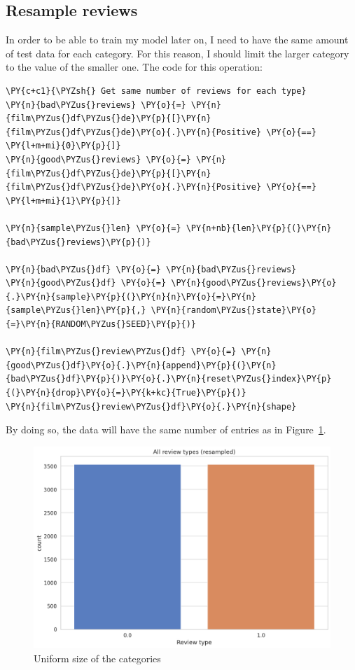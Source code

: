 \subsection{Resample reviews}
\label{chap:resample}
In order to be able to train my model later on, I need to have the same amount of test data for each category. For this reason, I should limit the larger category to the value of the smaller one.
The code for this operation:
        \begin{tcolorbox}[breakable, size=fbox, boxrule=1pt, pad at break*=1mm,colback=cellbackground, colframe=cellborder]
\begin{Verbatim}[commandchars=\\\{\},fontsize=\footnotesize]
\PY{c+c1}{\PYZsh{} Get same number of reviews for each type}
\PY{n}{bad\PYZus{}reviews} \PY{o}{=} \PY{n}{film\PYZus{}df\PYZus{}de}\PY{p}{[}\PY{n}{film\PYZus{}df\PYZus{}de}\PY{o}{.}\PY{n}{Positive} \PY{o}{==} \PY{l+m+mi}{0}\PY{p}{]}
\PY{n}{good\PYZus{}reviews} \PY{o}{=} \PY{n}{film\PYZus{}df\PYZus{}de}\PY{p}{[}\PY{n}{film\PYZus{}df\PYZus{}de}\PY{o}{.}\PY{n}{Positive} \PY{o}{==} \PY{l+m+mi}{1}\PY{p}{]}

\PY{n}{sample\PYZus{}len} \PY{o}{=} \PY{n+nb}{len}\PY{p}{(}\PY{n}{bad\PYZus{}reviews}\PY{p}{)}

\PY{n}{bad\PYZus{}df} \PY{o}{=} \PY{n}{bad\PYZus{}reviews}
\PY{n}{good\PYZus{}df} \PY{o}{=} \PY{n}{good\PYZus{}reviews}\PY{o}{.}\PY{n}{sample}\PY{p}{(}\PY{n}{n}\PY{o}{=}\PY{n}{sample\PYZus{}len}\PY{p}{,} \PY{n}{random\PYZus{}state}\PY{o}{=}\PY{n}{RANDOM\PYZus{}SEED}\PY{p}{)}

\PY{n}{film\PYZus{}review\PYZus{}df} \PY{o}{=} \PY{n}{good\PYZus{}df}\PY{o}{.}\PY{n}{append}\PY{p}{(}\PY{n}{bad\PYZus{}df}\PY{p}{)}\PY{o}{.}\PY{n}{reset\PYZus{}index}\PY{p}{(}\PY{n}{drop}\PY{o}{=}\PY{k+kc}{True}\PY{p}{)}
\PY{n}{film\PYZus{}review\PYZus{}df}\PY{o}{.}\PY{n}{shape}
\end{Verbatim}
\end{tcolorbox}

By doing so, the data will have  the same number of entries as in Figure~\ref{fig:fig_05}.

\begin{figure}[H]
\centering
\includegraphics[width=1\textwidth]{images/output_47_0.png}
\caption{Uniform size of the categories}
\label{fig:fig_05}
\end{figure}
\FloatBarrier


